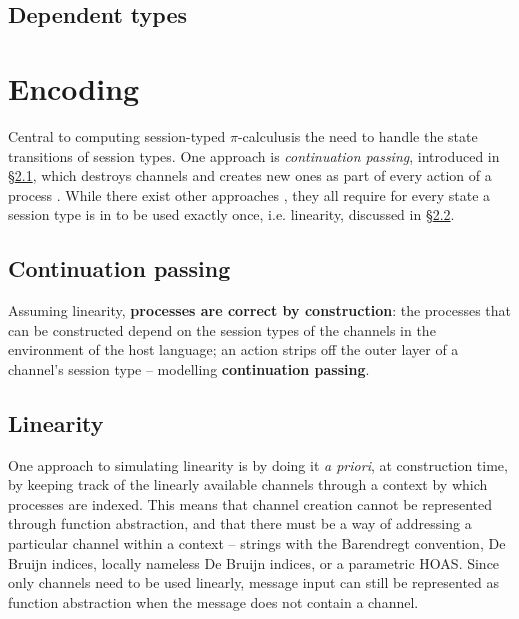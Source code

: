 \documentclass{mproj}
\newcommand{\picalc}{$\pi$-calculus}
\begin{document}
\section{Dependent types}\label{dependent-types}


\chapter{Encoding}\label{encoding}

Central to computing session-typed \picalc is the need to handle the state transitions of session types. One approach is \textit{continuation passing}, introduced in \S \ref{continuation-passing}, which destroys channels and creates new ones as part of every action of a process \cite{Dardha2016m}. While there exist other approaches , they all require for every state a session type is in to be used exactly once, i.e. linearity, discussed in \S \ref{linearity}.

\section{Continuation passing}\label{continuation-passing}

\cite{Vasconcelos2010}


Assuming linearity, \textbf{processes are correct by construction}: the processes that can be constructed depend on the session types of the channels in the environment of the host language; an action strips off the outer layer of a channel's session type -- modelling \textbf{continuation passing}.

\section{Linearity}\label{linearity}

\cite{Kobayashi1999}
\cite{Toninho2011}

One approach to simulating linearity is by doing it \textit{a priori}, at construction time, by keeping track of the linearly available channels through a context by which processes are indexed. This means that channel creation cannot be represented through function abstraction, and that there must be a way of addressing a particular channel within a context -- strings with the Barendregt convention, De Bruijn indices, locally nameless De Bruijn indices, or a parametric HOAS. Since only channels need to be used linearly, message input can still be represented as function abstraction when the message does not contain a channel. 
\end{document}
